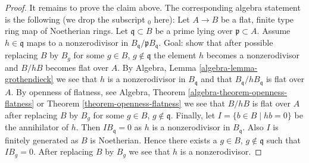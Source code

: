 \begin{proof}
\medskip\noindent
It remains to prove the claim above. The corresponding algebra statement
is the following (we drop the subscript ${}_0$ here):
Let $A \to B$ be a flat, finite type ring map of Noetherian rings.
Let $\mathfrak q \subset B$ be a prime lying over $\mathfrak p \subset A$.
Assume $h \in \mathfrak q$ maps to a nonzerodivisor in
$B_{\mathfrak q}/\mathfrak p B_{\mathfrak q}$.
Goal: show that after possible replacing $B$ by $B_g$ for some
$g \in B$, $g \not \in \mathfrak q$ the element $h$ becomes a nonzerodivisor
and $B/hB$ becomes flat over $A$. By
Algebra, Lemma \ref{algebra-lemma-grothendieck}
we see that $h$ is a nonzerodivisor in $B_{\mathfrak q}$ and that
$B_{\mathfrak q}/hB_{\mathfrak q}$ is flat over $A$.
By openness of flatness, see
Algebra, Theorem \ref{algebra-theorem-openness-flatness}
or
Theorem \ref{theorem-openness-flatness}
we see that $B/hB$ is flat over $A$ after replacing $B$ by $B_g$ for some
$g \in B$, $g \not \in \mathfrak q$. Finally, let
$I = \{b \in B \mid hb = 0\}$ be the annihilator of $h$. Then
$IB_{\mathfrak q} = 0$ as $h$ is a nonzerodivisor in $B_{\mathfrak q}$.
Also $I$ is finitely generated as $B$ is Noetherian.
Hence there exists a $g \in B$, $g \not \in \mathfrak q$ such that $IB_g = 0$.
After replacing $B$ by $B_g$ we see that $h$ is a nonzerodivisor.
\end{proof}
